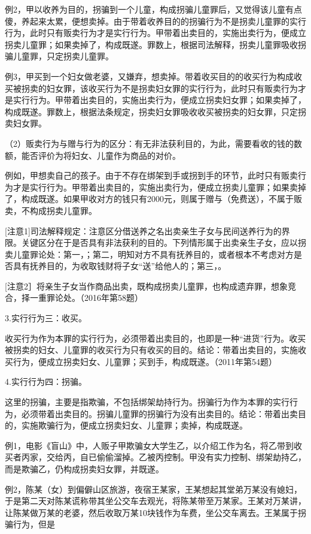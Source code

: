 例2，甲以收养为目的，拐骗到一个儿童，构成拐骗儿童罪后，又觉得该儿童有点傻，养起来太累，便想卖掉。由于带着收养目的的拐骗行为不是拐卖儿童罪的实行行为，此时只有贩卖行为才是实行行为。甲带着出卖目的，实施出卖行为，便成立拐卖儿童罪；如果卖掉了，构成既遂。罪数上，根据司法解释，拐卖儿童罪吸收拐骗儿童罪，只定拐卖儿童罪。

例3，甲买到一个妇女做老婆，又嫌弃，想卖掉。带着收买目的的收买行为构成收买被拐卖的妇女罪，该收买行为不是拐卖妇女罪的实行行为，此时只有贩卖行为才是实行行为。甲带着出卖目的，实施出卖行为，便成立拐卖妇女罪；如果卖掉了，构成既遂。罪数上，根据法条规定，拐卖妇女罪吸收收买被拐卖的妇女罪，只定拐卖妇女罪。

（2）贩卖行为与赠与行为的区分：有无非法获利目的，为此，需要看收的钱的数额，能否评价为将妇女、儿童作为商品的对价。

例如，甲想卖自己的孩子。由于不存在绑架到手或拐到手的环节，此时只有贩卖行为才是实行行为。甲带着出卖目的，实施出卖行为，便成立拐卖儿童罪；如果卖掉了，构成既遂。如果甲收对方的钱只有2000元，则属于赠与（免费送），不属于贩卖，不构成拐卖儿童罪。

[注意1]司法解释规定：注意区分借送养之名出卖亲生子女与民间送养行为的界限。关键区分在于是否具有非法获利的目的。下列情形属于出卖亲生子女，应以拐卖儿童罪论处：第一，；第二，明知对方不具有抚养目的，或者根本不考虑对方是否具有抚养目的，为收取钱财将子女“送”给他人的；第三，。

[注意2］将亲生子女当作商品出卖，既构成拐卖儿童罪，也构成遗弃罪，想象竞合，择一重罪论处。（2016年第58题）

3.实行行为三：收买。

收买行为作为本罪的实行行为，必须带着出卖目的，也即是一种“进货”行为。收买被拐卖的妇女、儿童罪的收买行为只有收买的目的。结论：带着出卖目的，实施收买行为，便成立拐卖妇女、儿童罪；买到手，构成既遂。（2011年第54题）

4.实行行为四：拐骗。

这里的拐骗，主要是指欺骗，不包括绑架劫持行为。拐骗行为作为本罪的实行行为，必须带着出卖目的。拐骗儿童罪的拐骗行为没有出卖目的。结论：带着出卖目的，实施欺骗行为，便成立拐卖妇女、儿童罪；卖掉，构成既遂。

例1，电影《盲山》中，人贩子甲欺骗女大学生乙，以介绍工作为名，将乙带到收买者丙家，交给丙，自已偷偷溜掉。乙被丙控制。甲没有实力控制、绑架劫持乙，而是欺骗乙，仍构成拐卖妇女罪，并既遂。

例2，陈某（女）到偏僻山区旅游，夜宿王某家，王某想起其堂弟万某没有媳妇，于是第二天对陈某谎称带其坐公交车去观光，将陈某带至万某家。王某对万某讲，让陈某做万某的老婆，然后收取万某10块钱作为车费，坐公交车离去。王某属于拐骗行为，但是

